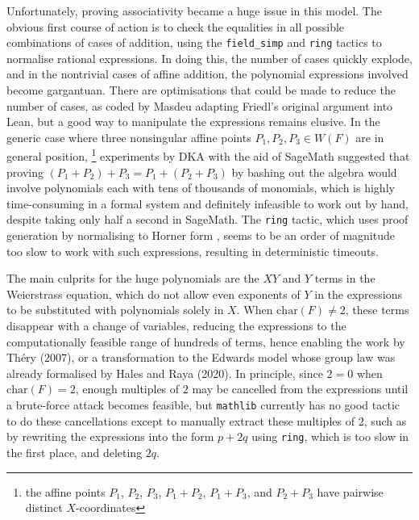\documentclass[a4paper,UKenglish,cleveref,autoref,thm-restate]{lipics-v2021}
\begin{document}
Unfortunately, proving associativity became a huge issue in this model. The obvious first course of action is to check the equalities in all possible combinations of cases of addition, using the \texttt{field\_simp} and \texttt{ring} tactics to normalise rational expressions. In doing this, the number of cases quickly explode, and in the nontrivial cases of affine addition, the polynomial expressions involved become gargantuan. There are optimisations that could be made to reduce the number of cases, as coded by Masdeu \cite{masdeu} adapting Friedl's original argument into Lean, but a good way to manipulate the expressions remains elusive. In the generic case where three nonsingular affine points $ P_1, P_2, P_3 \in W(F) $ are in general position, \footnote{the affine points $ P_1 $, $ P_2 $, $ P_3 $, $ P_1 + P_2 $, $ P_1 + P_3 $, and $ P_2 + P_3 $ have pairwise distinct $ X $-coordinates} experiments by DKA with the aid of SageMath suggested that proving $ (P_1 + P_2) + P_3 = P_1 + (P_2 + P_3) $ by bashing out the algebra would involve polynomials each with tens of thousands of monomials, which is highly time-consuming in a formal system and definitely infeasible to work out by hand, despite taking only half a second in SageMath. The \texttt{ring} tactic, which uses proof generation by normalising to Horner form \cite{gregoire}, seems to be an order of magnitude too slow to work with such expressions, resulting in deterministic timeouts.

\pagebreak

The main culprits for the huge polynomials are the $ XY $ and $ Y $ terms in the Weierstrass equation, which do not allow even exponents of $ Y $ in the expressions to be substituted with polynomials solely in $ X $. When $ \mathrm{char}(F) \ne 2 $, these terms disappear with a change of variables, reducing the expressions to the computationally feasible range of hundreds of terms, hence enabling the work by Th\'ery (2007), or a transformation to the Edwards model whose group law was already formalised by Hales and Raya (2020). In principle, since $ 2 = 0 $ when $ \mathrm{char}(F) = 2 $, enough multiples of $ 2 $ may be cancelled from the expressions until a brute-force attack becomes feasible, but \texttt{mathlib} currently has no good tactic to do these cancellations except to manually extract these multiples of $ 2 $, such as by rewriting the expressions into the form $ p + 2q $ using \texttt{ring}, which is too slow in the first place, and deleting $ 2q $.
\end{document}
